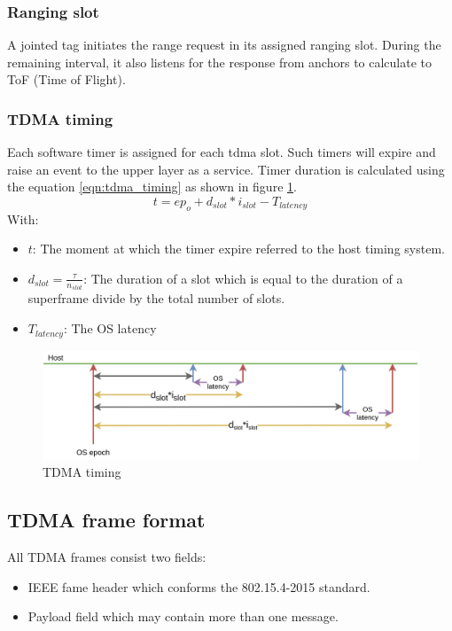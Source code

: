 \documentclass[\main/main.tex]{subfiles}
\begin{document}
\subsubsection{Ranging slot}
A jointed tag initiates the range request in its assigned ranging slot. During the remaining interval, it also listens for the response from anchors to calculate to ToF (Time of Flight).

\subsubsection{TDMA timing}
Each software timer is assigned for each tdma slot. Such timers will expire and raise an event to the upper layer as a service. Timer duration is calculated using the equation \ref{eqn:tdma_timing} as shown in figure \ref{fig:tdma_timing}.
\begin{equation}
    t = ep_o + d_{slot}*i_{slot} - T_{latency}
    \label{eqn:tdma_timing}
\end{equation}
With: 
\begin{itemize}
    \item $t$: The moment at which the timer expire referred to the host timing system.
    \item $d_{slot} = \frac{\tau}{n_{slot}}$: The duration of a slot which is equal to the duration of a superframe divide by the total number of slots.
    \item $T_{latency}$: The OS latency
\end{itemize}

\begin{figure}[H]
    \begin{center}
        \includegraphics[width=1\textwidth]{tdma_timing.png}
    \end{center}
    \caption{TDMA timing}
    \label{fig:tdma_timing}
\end{figure}


\subsection{TDMA frame format}
All TDMA frames consist two fields:
\begin{itemize}
    \item IEEE fame header which conforms the 802.15.4-2015 standard.
    \item Payload field which may contain more than one message. 
\end{itemize}
\end{document}
